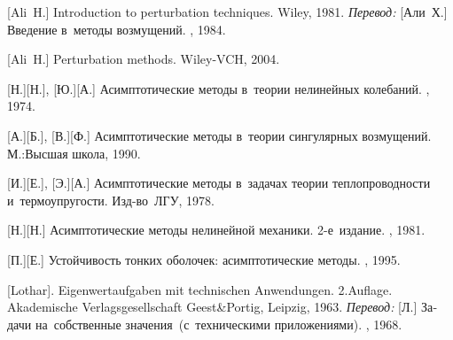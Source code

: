 \begin{thebibliography}{123}
\begin{otherlanguage}{russian}
[Ali~H.] Introduction to perturbation techniques. Wiley, 1981. 
\emph{Перевод:} [Али~Х.] Введение в~методы возмущений. \mirpublisher, 1984. 

[Ali~H.] Perturbation methods. Wiley-VCH, 2004. 

[Н.][Н.], [Ю.][А.] Асимптотические методы в~теории нелинейных колебаний. \naukapublisher, 1974. 

[А.][Б.], [В.][Ф.] Асимптотические методы в~теории сингулярных возмущений. М.:\;Высшая школа, 1990. 

[И.][Е.], %
[Э.][А.] %
Асимптотические методы в~задачах теории теплопроводности и~термоупругости. Изд\hbox{-}во~ЛГУ, 1978. 

[Н.][Н.] Асимптотические методы нелинейной механики. 2\hbox{-}е~издание. \naukapublisher, 1981. 

[П.][Е.] Устойчивость тонких оболочек: асимптотические методы. \naukapublisher, 1995. 

%
%



[Lothar]. Eigenwertaufgaben mit technischen Anwendungen. 2.\:Auflage. Akademische Verlagsgesellschaft Geest\;\&\;Portig, Leipzig, 1963. 
\emph{Перевод:} [Л.] Задачи на~собственные значения~(с~техническими приложениями). \naukapublisher, 1968. 


\end{otherlanguage}
\end{thebibliography}
